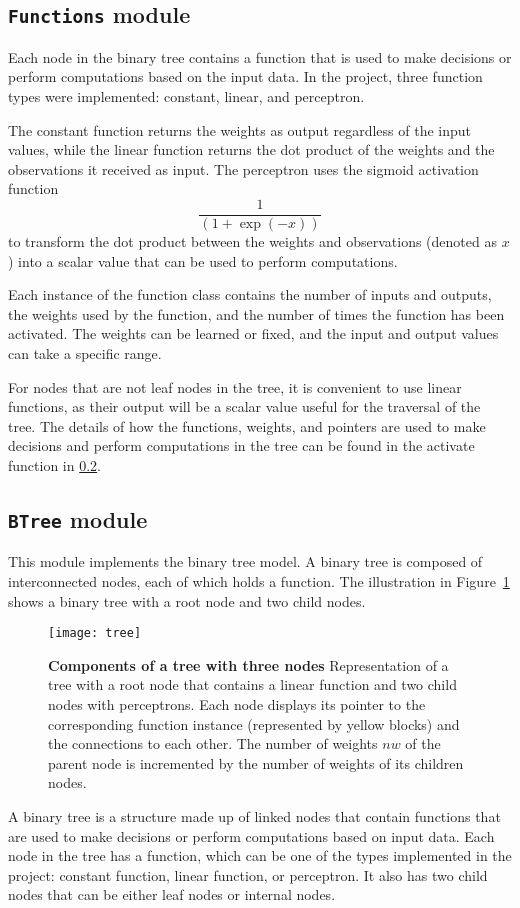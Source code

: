 \subsection{\texttt{Functions} module}
Each node in the binary tree contains a function that is used to make decisions or perform computations based on the input data. In the project, three function types were implemented: constant, linear, and perceptron.

The constant function returns the weights as output regardless of the input values, while the linear function returns the dot product of the weights and the observations it received as input. The perceptron uses the sigmoid activation function
\begin{equation}
\frac{1} {(1 + \exp(-x))}
\end{equation}
 to transform the dot product between the weights and observations (denoted as $x$) into a scalar value that can be used to perform computations.

Each instance of the function class contains the number of inputs and outputs, the weights used by the function, and the number of times the function has been activated. The weights can be learned or fixed, and the input and output values can take a specific range.

For nodes that are not leaf nodes in the tree, it is convenient to use linear functions, as their output will be a scalar value useful for the traversal of the tree. The details of how the functions, weights, and pointers are used to make decisions and perform computations in the tree can be found in the activate function in \ref{binary_tree}.

\subsection{\texttt{BTree} module}
\label{binary_tree}
This module implements the binary tree model. A binary tree is composed of interconnected nodes, each of which holds a function. The illustration in Figure~\ref{fig:tree_composition} shows a binary tree with a root node and two child nodes.
\begin{figure}[!ht]
\centering
\texttt{[image: tree]}
\caption[Components of a tree with three nodes]{
  \textbf{Components of a tree with three nodes}
Representation of a tree with a root node that contains a linear function and two child nodes with perceptrons. Each node displays its pointer to the corresponding function instance (represented by yellow blocks) and the connections to each other. The number of weights $nw$ of the parent node is incremented by the number of weights of its children nodes.
 }
\label{fig:tree_composition}
\end{figure}
A binary tree is a structure made up of linked nodes that contain functions that are used to make decisions or perform computations based on input data. Each node in the tree has a function, which can be one of the types implemented in the project: constant function, linear function, or perceptron. It also has two child nodes that can be either leaf nodes or internal nodes.

